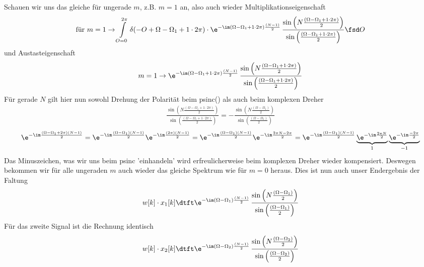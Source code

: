 \begin{ExCalc}
%
Schauen wir uns das gleiche für ungerade $m$, z.B. $m=1$ an, also auch wieder
Multiplikationseigenschaft
\begin{align}
\text{für   }m=1\rightarrow
\int\limits_{O=0}^{2\pi}
\delta(-O+\Omega-\Omega_1+1\cdot2\pi)
\cdot
\e^{-\im(\Omega-\Omega_1 + 1\cdot2\pi)\frac{(N-1)}{2}}\,
\frac{\sin\left(N\frac{(\Omega-\Omega_1 + 1\cdot2\pi)}{2}\right)}{\sin\left(\frac{(\Omega-\Omega_1 + 1\cdot2\pi)}{2}\right)}\fsd O
\end{align}
und Austasteigenschaft
\begin{align}
m=1\rightarrow
\e^{-\im (\Omega-\Omega_1 + 1\cdot2\pi) \frac{(N-1)}{2}}\,
\frac{\sin\left(N\frac{(\Omega-\Omega_1 + 1\cdot2\pi)}{2}\right)}{\sin\left(\frac{(\Omega-\Omega_1 + 1\cdot2\pi)}{2}\right)}
\end{align}
Für gerade $N$ gilt hier nun sowohl Drehung der Polarität beim psinc() als auch beim komplexen Dreher
\begin{align}
\frac{\sin\left(N\frac{(\Omega-\Omega_1 + 1\cdot2\pi)}{2}\right)}{\sin\left(\frac{(\Omega-\Omega_1 + 1\cdot2\pi)}{2}\right)}
= -
\frac{\sin\left(N\frac{(\Omega-\Omega_1)}{2}\right)}{\sin\left(\frac{(\Omega-\Omega_1)}{2}\right)}
\end{align}
%
\begin{align}
\e^{-\im\frac{(\Omega-\Omega_1 + 2\pi)(N-1)}{2}}=
\e^{-\im\frac{(\Omega-\Omega_1)(N-1)}{2}}
\e^{-\im\frac{(2\pi)(N-1)}{2}}=
\e^{-\im\frac{(\Omega-\Omega_1)(N-1)}{2}}
\e^{-\im\frac{2\pi N -2\pi}{2}}=
\e^{-\im\frac{(\Omega-\Omega_1)(N-1)}{2}}
\underbrace{\e^{-\im\frac{2\pi N}{2}}}_{1}
\underbrace{\e^{-\im\frac{-2\pi}{2}}}_{-1}
\end{align}
Das Minuszeichen, was wir uns beim psinc 'einhandeln' wird erfreulicherweise
beim komplexen Dreher wieder kompensiert.  Deswegen bekommen wir für alle ungeraden $m$
auch wieder das gleiche Spektrum wie für $m=0$ heraus.
%
Dies ist nun auch unser Endergebnis der Faltung
\begin{align}
w[k] \cdot x_1[k]\dtft
\e^{-\im (\Omega-\Omega_1) \frac{(N-1)}{2}}\,
\frac{\sin\left(N\frac{(\Omega-\Omega_1)}{2}\right)}{\sin\left(\frac{(\Omega-\Omega_1)}{2}\right)}
\end{align}
Für das zweite Signal ist die Rechnung identisch
\begin{align}
w[k] \cdot x_2[k]\dtft
\e^{-\im (\Omega-\Omega_2) \frac{(N-1)}{2}}\,
\frac{\sin\left(N\frac{(\Omega-\Omega_2)}{2}\right)}{\sin\left(\frac{(\Omega-\Omega_2)}{2}\right)}
\end{align}
%
\end{ExCalc}
